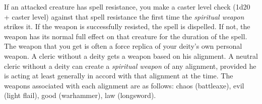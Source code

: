 If an attacked creature has spell resistance, you make a caster level check (1d20 + caster level) against that spell resistance the first time the \textit{spiritual weapon }strikes it. If the weapon is successfully resisted, the spell is dispelled. If not, the weapon has its normal full effect on that creature for the duration of the spell.\\
The weapon that you get is often a force replica of your deity's own personal weapon. A cleric without a deity gets a weapon based on his alignment. A neutral cleric without a deity can create a \textit{spiritual weapon }of any alignment, provided he is acting at least generally in accord with that alignment at the time. The weapons associated with each alignment are as follows: chaos (battleaxe), evil (light flail), good (warhammer), law (longsword).\\

